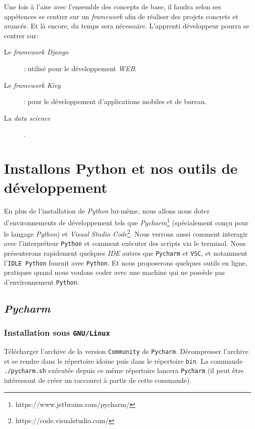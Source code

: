\documentclass[a4paper,11pt]{book}
\begin{document}
Une fois à l'aise avec l'ensemble des concepts de base, il faudra selon ses appétences se centrer sur un \textit{framework} afin de réaliser des projets concrets et avancés. Et là encore, du temps sera nécessaire. L'apprenti développeur pourra se centrer sur:
\begin{description}
    \item[Le \textit{framework Django}]: utilisé pour le développement \textit{WEB}.
    \item[Le \textit{framework Kivy}]: pour le développement d'applications mobiles et de bureau.
    \item[La \textit{data science}].
\end{description}
\chapter{Installons Python et nos outils de développement}
En plus de l'installation de \textit{Python} lui-même, nous allons nous doter d'environnements de développement tels que \textit{Pycharm}\footnote{https://www.jetbrains.com/pycharm/} (spécialement conçu pour le langage \textit{Python}) et \textit{Visual Studio Code}\footnote{https://code.visualstudio.com/}. Nous verrons aussi comment interagir avec l'interpréteur \texttt{Python} et comment exécuter des scripts via le terminal. Nous présenterons rapidement quelques \textit{IDE} autres que \texttt{Pycharm} et \texttt{VSC}, et notamment l'\texttt{IDLE Python} fournit avec \texttt{Python}. Et nous proposerons quelques outils en ligne, pratiques quand nous voulons coder avec une machine qui ne possède pas d'environnement \texttt{Python}.
\medskip

\section{\textit{Pycharm}}
\subsection*{Installation sous \texttt{GNU/Linux}}
Télécharger l'archive de la version \texttt{Community} de \texttt{Pycharm}. Décompresser l'archive et se rendre dans le répertoire idoine puis dans le répertoire \texttt{bin}. La commande \verb|./pycharm.sh| exécutée depuis ce même répertoire lancera \texttt{Pycharm} (il peut être intéressant de créer un raccourci à partir de cette commande).
\medskip
\end{document}
